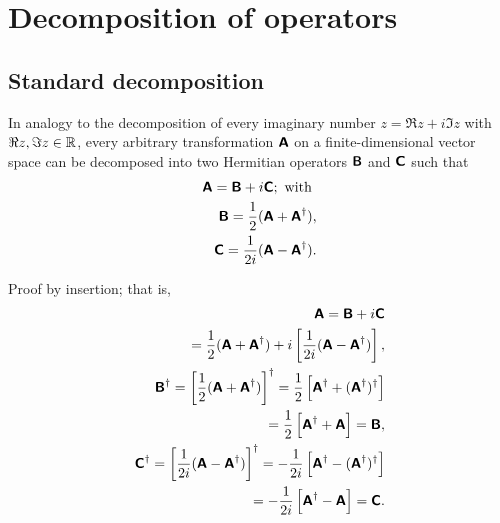 \section{Decomposition of operators}

\subsection{Standard decomposition}

In analogy to the decomposition of every imaginary number $z= \Re z +i \Im z$ with $\Re z,\Im z\in {\Bbb R}$,
every arbitrary transformation $\textsf{\textbf{A}}$ on a finite-dimensional vector space can be decomposed into two Hermitian operators
$\textsf{\textbf{B}}$
and
$\textsf{\textbf{C}}$
such that
\begin{equation}
\begin{split}
\textsf{\textbf{A}}=\textsf{\textbf{B}} + i \textsf{\textbf{C}}; \textrm{ with }  \\
\textsf{\textbf{B}}=\frac{1}{2}(\textsf{\textbf{A}} +   \textsf{\textbf{A}}^\dagger ), \\
\textsf{\textbf{C}}=\frac{1}{2i}(\textsf{\textbf{A}} -   \textsf{\textbf{A}}^\dagger ).
\end{split}
\end{equation}

{\color{OliveGreen}
\bproof
Proof by insertion; that is,
\begin{equation}
\begin{split}
\textsf{\textbf{A}}=\textsf{\textbf{B}} + i \textsf{\textbf{C}}\\
\quad =
\frac{1}{2}(\textsf{\textbf{A}} +   \textsf{\textbf{A}}^\dagger ) + i \left[\frac{1}{2i}(\textsf{\textbf{A}} -   \textsf{\textbf{A}}^\dagger )\right],
\\
\textsf{\textbf{B}}^\dagger=   \left[\frac{1}{2}(\textsf{\textbf{A}} +   \textsf{\textbf{A}}^\dagger )\right]^\dagger
  =    \frac{1}{2}\left[\textsf{\textbf{A}}^\dagger +  ( \textsf{\textbf{A}}^\dagger )^\dagger \right]\\
 =    \frac{1}{2}\left[\textsf{\textbf{A}}^\dagger +    \textsf{\textbf{A}} \right]
 =  \textsf{\textbf{B}} , \\
\textsf{\textbf{C}}^\dagger=   \left[\frac{1}{2i}(\textsf{\textbf{A}} -   \textsf{\textbf{A}}^\dagger )\right]^\dagger
 =   -\frac{1}{2i}\left[\textsf{\textbf{A}}^\dagger -  ( \textsf{\textbf{A}}^\dagger )^\dagger \right]\\
  =   -\frac{1}{2i}\left[\textsf{\textbf{A}}^\dagger -    \textsf{\textbf{A}}\right]
 =  \textsf{\textbf{C}} .
\end{split}
\end{equation}
\eproof
}


